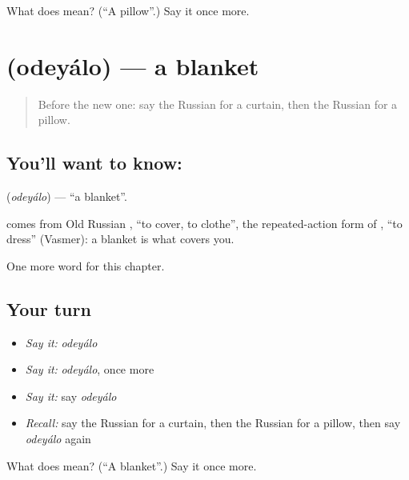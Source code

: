 \begin{tcolorbox}[breakable,colback=teal!4,colframe=teal!35!black,title={Before you move on}]
What does  mean? (\textquotedblleft{}A pillow\textquotedblright{}.) Say it once more.
\end{tcolorbox}
\section[\texorpdfstring{\ru{одеяло} (odeyálo)}{одеяло (odeyálo)}]{ (odeyálo) — a blanket}

\label{lesson:RU-C95-blanket}



\begin{quote}
Before the new one: say the Russian for a curtain, then the Russian for a pillow.
\end{quote}

\subsection*{You'll want to know: }
\textbf{} (\emph{odeyálo}) — \textquotedblleft{}a blanket\textquotedblright{}.

\begin{cousinweb}
\textbf{} comes from Old Russian \emph{}, \textquotedblleft{}to cover, to clothe\textquotedblright{}, the repeated-action form of \emph{}, \textquotedblleft{}to dress\textquotedblright{} (Vasmer): a blanket is what covers you.
\end{cousinweb}

\begin{grammarlens}[title={What you've built}]
One more word for this chapter.
\end{grammarlens}

\subsection*{Your turn}
\begin{itemize}
\raggedright
  \item \emph{Say it:} \emph{odeyálo}
  \item \emph{Say it:} \emph{odeyálo}, once more
  \item \emph{Say it:} say \emph{odeyálo}
  \item \emph{Recall:} say the Russian for a curtain, then the Russian for a pillow, then say \emph{odeyálo} again
\end{itemize}

\begin{tcolorbox}[breakable,colback=teal!4,colframe=teal!35!black,title={Before you move on}]
What does  mean? (\textquotedblleft{}A blanket\textquotedblright{}.) Say it once more.
\end{tcolorbox}
